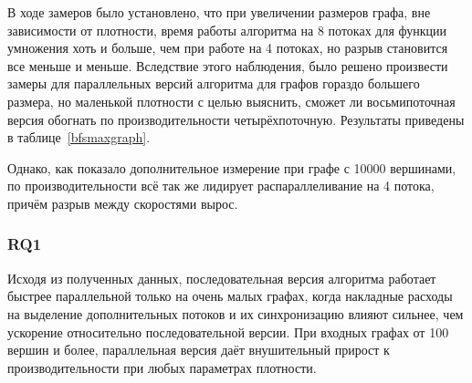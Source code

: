 В ходе замеров было установлено, что при увеличении размеров графа, вне зависимости от плотности, время работы алгоритма на 8 потоках для функции умножения хоть и больше, чем при работе на 4 потоках, но разрыв становится все меньше и меньше. Вследствие этого наблюдения, было решено произвести замеры для параллельных версий алгоритма для графов гораздо большего размера, но маленькой плотности с целью выяснить, сможет ли восьмипоточная версия обогнать по производительности четырёхпоточную. Результаты приведены в таблице~\ref{bfsmaxgraph}.

\begin{table}[h]
\centering
    \caption{Сравнение производительности алгоритма обхода в ширину при использовании 4 и 8 потоков для функции умножения. Графа \texttt{SpeedUp} показывает отношение скорости работы алгоритма при 8 потоках к скорости работы при 4 потоках.}
    \label{bfsmaxgraph}
\end{table}

Однако, как показало дополнительное измерение при графе с 10000 вершинами, по производительности всё так же лидирует распараллеливание на 4 потока, причём разрыв между скоростями вырос.

\subsubsection{RQ1} Исходя из полученных данных, последовательная версия алгоритма работает быстрее параллельной только на очень малых графах, когда накладные расходы на выделение дополнительных потоков и их синхронизацию влияют сильнее, чем ускорение относительно последовательной версии. При входных графах от 100 вершин и более, параллельная версия даёт внушительный прирост к производительности при любых параметрах плотности.
